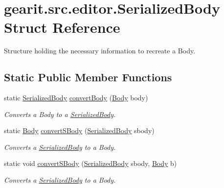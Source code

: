 \hypertarget{structgearit_1_1src_1_1editor_1_1_serialized_body}{\section{gearit.\+src.\+editor.\+Serialized\+Body Struct Reference}
\label{structgearit_1_1src_1_1editor_1_1_serialized_body}
}


Structure holding the necessary information to recreate a Body.  


\subsection*{Static Public Member Functions}
\begin{DoxyCompactItemize}
\item 
static \hyperlink{structgearit_1_1src_1_1editor_1_1_serialized_body}{Serialized\+Body} \hyperlink{structgearit_1_1src_1_1editor_1_1_serialized_body_a718d365edc5b3840f6c2ffda8c4ac35f}{convert\+Body} (\hyperlink{class_farseer_physics_1_1_dynamics_1_1_body}{Body} body)
\begin{DoxyCompactList}\small\item\em Converts a Body to a \hyperlink{structgearit_1_1src_1_1editor_1_1_serialized_body}{Serialized\+Body}. \end{DoxyCompactList}\item 
static \hyperlink{class_farseer_physics_1_1_dynamics_1_1_body}{Body} \hyperlink{structgearit_1_1src_1_1editor_1_1_serialized_body_aa1c6069e47e2442738206229e794f931}{convert\+S\+Body} (\hyperlink{structgearit_1_1src_1_1editor_1_1_serialized_body}{Serialized\+Body} sbody)
\begin{DoxyCompactList}\small\item\em Converts a \hyperlink{structgearit_1_1src_1_1editor_1_1_serialized_body}{Serialized\+Body} to a Body. \end{DoxyCompactList}\item 
static void \hyperlink{structgearit_1_1src_1_1editor_1_1_serialized_body_a7ff6d306944852d12903439765ddc41e}{convert\+S\+Body} (\hyperlink{structgearit_1_1src_1_1editor_1_1_serialized_body}{Serialized\+Body} sbody, \hyperlink{class_farseer_physics_1_1_dynamics_1_1_body}{Body} b)
\begin{DoxyCompactList}\small\item\em Converts a \hyperlink{structgearit_1_1src_1_1editor_1_1_serialized_body}{Serialized\+Body} to a Body. \end{DoxyCompactList}\end{DoxyCompactItemize}


